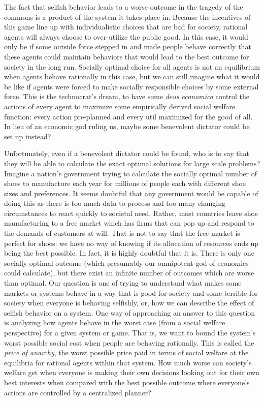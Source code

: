 \documentclass[12pt,twoside]{reedthesis}
\begin{document}
The fact that selfish behavior leads to a worse outcome in the tragedy of the commons is a product of the system it takes place in. Because the incentives of this game line up with individualistic choices that are bad for society, rational agents will always choose to over-utilize the public good. In this case, it would only be if some outside force stepped in and made people behave correctly that these agents could maintain behaviors that would lead to the best outcome for society in the long run. Socially optimal choice for all agents is not an equilibrium when agents behave rationally in this case, but we can still imagine what it would be like if agents were forced to make socially responsible choices by some external force. This is the technocrat's dream, to have some {\em deus economica} control the actions of every agent to maximize some empirically derived social welfare function: every action pre-planned and every util maximized for the good of all. In lieu of an economic god ruling us, maybe some benevolent dictator could be set up instead? 

Unfortunately, even if a benevolent dictator could be found, who is to say that they will be able to calculate the exact optimal solutions for large scale problems? Imagine a nation's government trying to calculate the socially optimal number of shoes to manufacture each year for millions of people each with different shoe sizes and preferences. It seems doubtful that any government would be capable of doing this as there is too much data to process and too many changing circumstances to react quickly to societal need. Rather, most countries leave shoe manufacturing to a free market which has firms that can pop up and respond to the demands of customers at will. That is not to say that the free market is perfect for shoes: we have no way of knowing if its allocation of resources ends up being the best possible. In fact, it is highly doubtful that it is. There is only one socially optimal outcome (which presumably our omnipotent god of economics could calculate), but there exist an infinite number of outcomes which are worse than optimal. Our question is one of trying to understand what makes some markets or systems behave in a way that is good for society and some terrible for society when everyone is behaving selfishly, or, how we can describe the effect of selfish behavior on a system. One way of approaching an answer to this question is analyzing how agents behave in the worst case (from a social welfare perspective) for a given system or game. That is, we want to bound the system's worst possible social cost when people are behaving rationally. This is called the {\em price of anarchy}, the worst possible price paid in terms of social welfare at the equilibria for rational agents within that system. How much worse can society's welfare get when everyone is making their own decisions looking out for their own best interests when compared with the best possible outcome where everyone's actions are controlled by a centralized planner? 
\end{document}
